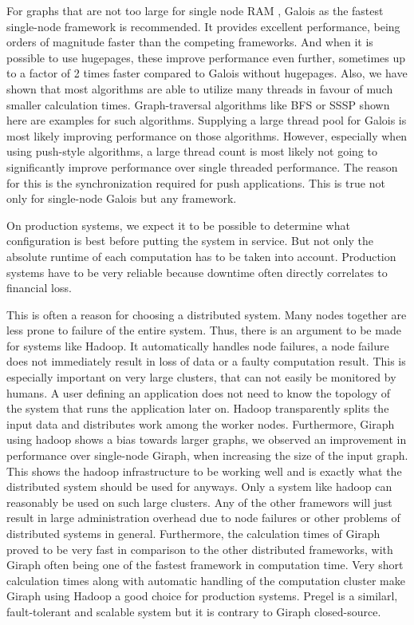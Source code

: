 For graphs that are not too large for single node RAM 
, Galois as the fastest single-node framework is recommended.
It provides excellent performance, being orders of magnitude faster than the competing frameworks. And when it is possible to use hugepages, these improve performance even further, sometimes up to a factor of 2 times faster compared to Galois without hugepages.
Also, we have shown that most algorithms are able to utilize many threads in favour of much smaller calculation times. Graph-traversal algorithms like BFS or SSSP shown here are examples for such algorithms.
Supplying a large thread pool for Galois is most likely improving performance on those algorithms.
However, especially when using push-style algorithms, a large thread count is most likely not going to significantly improve performance over single threaded performance. The reason for this is the synchronization required for push applications. This is true not only for single-node Galois but any framework.



On production systems, we expect it to be possible to determine what configuration is best before putting the system in service.
But not only the absolute runtime of each computation has to be taken into account. Production systems have to be very reliable because downtime often directly correlates to financial loss.

This is often a reason for choosing a distributed system. Many nodes together are less prone to failure of the entire system.
Thus, there is an argument to be made for systems like Hadoop.
It automatically handles node failures, a node failure does not immediately result in loss of data or a faulty computation result.
This is especially important on very large clusters, that can not easily be monitored by humans.
A user defining an application does not need to know the topology of the system that runs the application later on.
Hadoop transparently splits the input data and distributes work among the worker nodes.
Furthermore, Giraph using hadoop shows a bias towards larger graphs, we observed an improvement in performance over single-node Giraph, when increasing the size of the input graph.
This shows the hadoop infrastructure to be working well and is exactly what the distributed system should be used for anyways. 
Only a system like hadoop can reasonably be used on such large clusters.
Any of the other framewors will just result in large administration overhead due to node failures or other problems of distributed systems in general.
Furthermore, the calculation times of Giraph proved to be very fast in comparison to the other distributed frameworks, with Giraph often being one of the fastest framework in computation time.
Very short calculation times along with automatic handling of the computation cluster make Giraph using Hadoop a good choice for production systems.
Pregel is a similarl, fault-tolerant and scalable system but it is contrary to Giraph closed-source.

